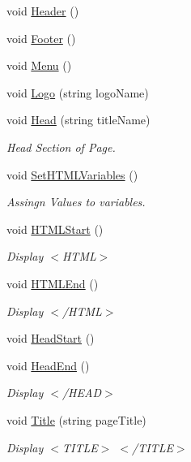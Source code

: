\begin{DoxyCompactItemize}
\item 
void \hyperlink{classPageLayout_a7726061f0653245f644a05807fa92472}{Header} ()
\item 
void \hyperlink{classPageLayout_a68aa868a8868b12964f161838b5f814c}{Footer} ()
\item 
void \hyperlink{classPageLayout_a49af1dca286bbee9432192a7b3c00332}{Menu} ()
\item 
void \hyperlink{classPageLayout_ae60235c6af48e3ebbc6343d02456da0c}{Logo} (string logo\-Name)
\item 
void \hyperlink{classPageLayout_ae50907d56f0ba7a85f7ccfdeafa45bcc}{Head} (string title\-Name)
\begin{DoxyCompactList}\small\item\em Head Section of Page. \end{DoxyCompactList}\item 
void \hyperlink{classHTMLTags_abe32ec84b6b2940afbc993be2db178e9}{Set\-H\-T\-M\-L\-Variables} ()
\begin{DoxyCompactList}\small\item\em Assingn Values to variables. \end{DoxyCompactList}\item 
void \hyperlink{classHTMLTags_a567551cd701d2836d4240b2917b5e13f}{H\-T\-M\-L\-Start} ()
\begin{DoxyCompactList}\small\item\em Display $<$\-H\-T\-M\-L$>$ \end{DoxyCompactList}\item 
void \hyperlink{classHTMLTags_a6553c3d01ee194a1d157e6341333dee3}{H\-T\-M\-L\-End} ()
\begin{DoxyCompactList}\small\item\em Display $<$/\-H\-T\-M\-L$>$ \end{DoxyCompactList}\item 
void \hyperlink{classHTMLTags_af2b01cc08884af52e0b291d07035062e}{Head\-Start} ()
\item 
void \hyperlink{classHTMLTags_afdc779e46fac16cc79e4f0e87f621254}{Head\-End} ()
\begin{DoxyCompactList}\small\item\em Display $<$/\-H\-E\-A\-D$>$ \end{DoxyCompactList}\item 
void \hyperlink{classHTMLTags_a5128d6f1c6be5ac1689047fc9d0d159f}{Title} (string page\-Title)
\begin{DoxyCompactList}\small\item\em Display $<$\-T\-I\-T\-L\-E$>$ $<$/\-T\-I\-T\-L\-E$>$ \end{DoxyCompactList}\item 

\end{DoxyCompactItemize}

